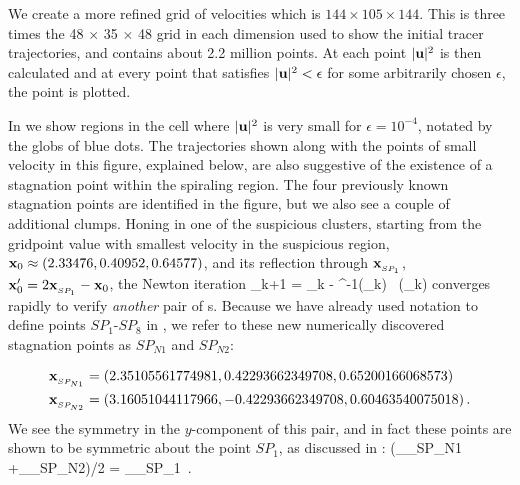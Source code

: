 \documentclass[letter,12pt,openany]{article}
\begin{document}
We create a more refined grid of velocities which
  is $144 \times 105 \times 144$. This is three times the 48 $\times$ 35
  $\times$ 48 grid in each dimension used to show the initial tracer trajectories, and contains about 2.2 million
  points. At each point $|{\bf u}|^{2}$ is then calculated and at
  every point that satisfies $|{\bf u}|^{2} < \epsilon$ for some
  arbitrarily chosen $\epsilon$, the point is plotted.

In  we show regions in the cell where $|{\bf u}|^{2}$ is very small for $\epsilon = 10^{-4}$, notated by the globs of blue dots. The trajectories shown along with the points of small velocity in this figure, explained below, are also suggestive of the existence of a stagnation point within the spiraling region. The four previously known stagnation points are identified in the figure, but we also see a couple of additional clumps. Honing in one of the suspicious clusters,
starting from the gridpoint value with smallest velocity in the suspicious region,
${\bf x}_{0} \approx (2.33476, 0.40952, 0.64577)$, and its reflection through
$\bold{x}_{_{SP_{1}}}$, ${\bf x}_{0}' =2 \bold{x}_{_{SP_{1}}} - {\bf x}_{0}$, the Newton iteration
 \beq
 \bx_{k+1} = \bx_{k} -
          {\Mvar}^{-1}(\bx_{k}) \, \bu(\bx_{k})
 \eeq
converges rapidly to verify \textit{another} pair of \stagp s. Because we have already used notation to define points $SP_1$-$SP_8$ in , we refer to these new numerically discovered stagnation points as $SP_{N1}$ and $SP_{N2}$: 

\begin{align}
&\bold{x}_{_{SP_{N1}}} =(2.35105561774981,0.42293662349708,0.65200166068573)
\\
&\bold{x}_{_{SP_{N2}}}=(3.16051044117966,-0.42293662349708,0.60463540075018)
\label{eqn:newspNewt}
\,.
\end{align}
We see the
 symmetry in the $y$-component of this pair, and in fact
these points are shown to be
 symmetric about the point $SP_1$, as discussed in :
 \beq
    (_{_{SP_{N1}}} +_{_{SP_{N2}}})/2 = _{_{SP_{1}}}
 \,.
 \eeq

 
\end{document}
